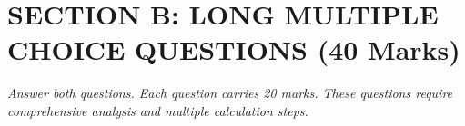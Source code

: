 \documentclass[12pt,a4paper]{article}
\begin{document}
\newpage
\section*{SECTION B: LONG MULTIPLE CHOICE QUESTIONS (40 Marks)}

{\large\itshape Answer both questions. Each question carries 20 marks. 
These questions require comprehensive analysis and multiple calculation steps.}

\vspace{0.5cm}

\end{document}
